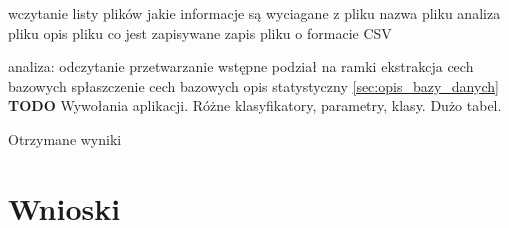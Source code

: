 \documentclass[a4paper,12pt,twoside,openany]{report}
\newcommand{\TODO}{\textbf{TODO}}
\newcommand*\NewPage{\newpage\null\thispagestyle{empty}\newpage}
\begin{document}
wczytanie listy plików
	jakie informacje są wyciagane z pliku
	nazwa pliku
analiza pliku
opis pliku
	co jest zapisywane
zapis pliku
	o formacie CSV

analiza:
odczytanie
przetwarzanie wstępne
podział na ramki
ekstrakcja cech bazowych
spłaszczenie cech bazowych
opis statystyczny
\ref{sec:opis_bazy_danych}
\TODO{
	Wywołania aplikacji.
	Różne klasyfikatory, parametry, klasy.
	Dużo tabel.
}
\begin{table}[hc!]
	\centering
	
	\caption{Otrzymane wyniki}
\end{table}

\NewPage
\NewPage
\NewPage
\NewPage
\NewPage
\NewPage
\NewPage

\chapter{Wnioski}
\NewPage
\NewPage

{}

\end{document}
